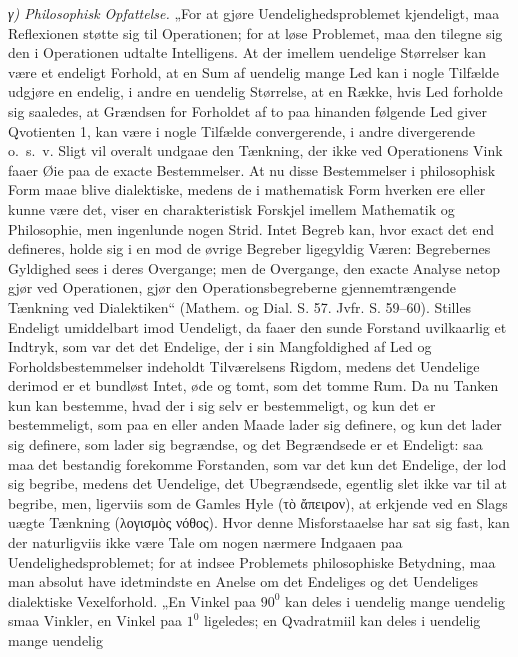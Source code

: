 \documentclass[12pt,a4paper]{book}
\begin{document}
\emph{γ) Philosophisk Opfattelse.} „For at gjøre Uendelighedsproblemet
kjendeligt, maa Reflexionen støtte sig til
Operationen; for at løse Problemet, maa den tilegne sig den
i Operationen udtalte Intelligens. At der imellem uendelige
Størrelser kan være et endeligt Forhold, at en Sum af
uendelig mange Led kan i nogle Tilfælde udgjøre en endelig,
i andre en uendelig Størrelse, at en Række, hvis Led forholde
sig saaledes, at Grændsen for Forholdet af to paa hinanden
følgende Led giver Qvotienten 1, kan være i nogle
Tilfælde convergerende, i andre divergerende o.~s.~v. Sligt
vil overalt undgaae den Tænkning, der ikke ved Operationens
Vink faaer Øie paa de exacte Bestemmelser. At nu disse
Bestemmelser i philosophisk Form maae blive dialektiske, medens
de i mathematisk Form hverken ere eller kunne være det,
viser en charakteristisk Forskjel imellem Mathematik og Philosophie,
men ingenlunde nogen Strid. Intet Begreb kan,
hvor exact det end defineres, holde sig i en mod de øvrige
Begreber ligegyldig Væren: Begrebernes Gyldighed sees i
deres Overgange; men de Overgange, den exacte Analyse netop
gjør ved Operationen, gjør den Operationsbegreberne gjennemtrængende
Tænkning ved Dialektiken“ (Mathem. og Dial. S. 57.
Jvfr. S. 59--60). Stilles Endeligt umiddelbart imod Uendeligt,
da faaer den sunde Forstand uvilkaarlig et Indtryk,
som var det det Endelige, der i sin Mangfoldighed af Led
og Forholdsbestemmelser indeholdt Tilværelsens Rigdom, medens
det Uendelige derimod er et bundløst Intet, øde og
tomt, som det tomme Rum. Da nu Tanken kun kan bestemme,
hvad der i sig selv er bestemmeligt, og kun det er
bestemmeligt, som paa en eller anden Maade lader sig definere,
og kun det lader sig definere, som lader sig begrændse, og det
Begrændsede er et Endeligt: saa maa det bestandig forekomme
Forstanden, som var det kun det Endelige, der lod sig begribe,
medens det Uendelige, det Ubegrændsede, egentlig slet
ikke var til at begribe, men, ligerviis som de Gamles Hyle
(τὸ ἄπειρον), at erkjende ved en Slags uægte Tænkning
(λογισμὸς νόθος). Hvor denne Misforstaaelse har sat sig
fast, kan der naturligviis ikke være Tale om nogen nærmere
Indgaaen paa Uendelighedsproblemet; for at indsee Problemets
philosophiske Betydning, maa man absolut have idetmindste
en Anelse om det Endeliges og det Uendeliges
dialektiske Vexelforhold. „En Vinkel paa $90^{0}$ kan deles i
uendelig mange uendelig smaa Vinkler, en Vinkel paa $1^{0}$
ligeledes; en Qvadratmiil kan deles i uendelig mange uendelig
\end{document}
